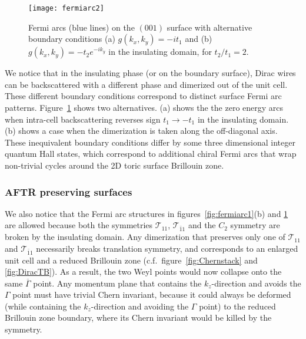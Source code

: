 \begin{figure}[htbp]\centering\texttt{[image: fermiarc2]}\caption{Fermi arcs (blue lines) on the $(001)$ surface with alternative boundary conditions (a) $g(k_x,k_y)=-it_1$ and (b) $g(k_x,k_y)=-t_2e^{-ik_y}$ in the insulating domain, for $t_2/t_1=2$.}\label{fig:fermiarc2}\end{figure}

We notice that in the insulating phase (or on the boundary surface), Dirac wires can be backscattered with a different phase and dimerized out of the unit cell. These different boundary conditions correspond to distinct surface Fermi arc patterns. Figure~\ref{fig:fermiarc2} shows two alternatives. (a) shows the the zero energy arcs when intra-cell backscattering reverses sign $t_1\to-t_1$ in the insulating domain. (b) shows a case when the dimerization is taken along the off-diagonal axis. These inequivalent boundary conditions differ by some three dimensional integer quantum Hall states, which correspond to additional chiral Fermi arcs that wrap non-trivial cycles around the 2D toric surface Brillouin zone.

\subsubsection{AFTR preserving surfaces}\label{sec:fermiarcAFTRpreserving}

We also notice that the Fermi arc structures in figures~\ref{fig:fermiarc1}(b) and \ref{fig:fermiarc2} are allowed because both the \AFTR symmetries $\mathcal{T}_{11}$, $\mathcal{T}_{\bar{1}1}$ and the $C_2$ symmetry are broken by the insulating domain. Any dimerization that preserves only one of $\mathcal{T}_{11}$ and $\mathcal{T}_{\bar{1}1}$ necessarily breaks translation symmetry, and corresponds to an enlarged unit cell and a reduced Brillouin zone (c.f.~figure~\ref{fig:Chernstack} and \ref{fig:DiracTB}). As a result, the two Weyl points would now collapse onto the same $\overline{\Gamma}$ point. Any momentum plane that contains the $k_z$-direction and avoids the $\Gamma$ point must have trivial Chern invariant, because it could always be deformed (while containing the $k_z$-direction and avoiding the $\Gamma$ point) to the reduced Brillouin zone boundary, where its Chern invariant would be killed by the \AFTR symmetry. %

